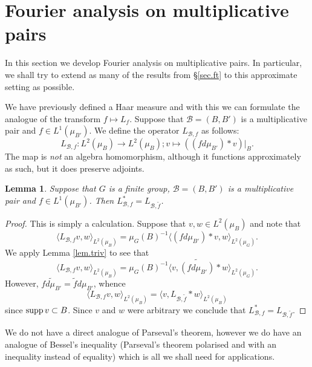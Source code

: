 \documentclass[12pt]{amsart}
\numberwithin{equation}{section}
\theoremstyle{plain}
\newtheorem{lemma}[subsection]{Lemma}
\theoremstyle{definition}
\providecommand{\supp}{\mathop{\rm supp}\nolimits}
\begin{document}
\section{Fourier analysis on multiplicative pairs}\label{sec.locft}

In this section we develop Fourier analysis on multiplicative pairs.  In particular, we shall try to extend as many of the results from \S\ref{sec.ft} to this approximate setting as possible.

We have previously defined a Haar measure and with this we can formulate the analogue of the transform $f \mapsto L_f$.  Suppose that $\mathcal{B}=(B,B')$ is a multiplicative pair and $f \in L^1(\mu_{B'})$.  We define the operator $L_{\mathcal{B},f}$ as follows:
\begin{equation*}
L_{\mathcal{B},f}:L^2(\mu_B) \rightarrow L^2(\mu_B); v \mapsto ((fd\mu_{B'}) \ast v)|_B.
\end{equation*}
The map is \emph{not} an algebra homomorphism, although it functions approximately as such, but it does  preserve adjoints.
\begin{lemma}
Suppose that $G$ is a finite group, $\mathcal{B}=(B,B')$ is a multiplicative pair and $f \in L^1(\mu_{B'})$. Then $L_{\mathcal{B},f}^*=L_{\mathcal{B},\tilde{f}}$.
\end{lemma}
\begin{proof}
This is simply a calculation.  Suppose that $v,w \in L^2(\mu_B)$ and note that
\begin{equation*}
\langle L_{\mathcal{B},f}v,w\rangle_{L^2(\mu_B)} = \mu_G(B)^{-1}\langle (fd\mu_{B'}) \ast v,w \rangle_{L^2(\mu_G)}.
\end{equation*}
We apply Lemma \ref{lem.triv} to see that
\begin{equation*}
\langle L_{\mathcal{B},f}v,w\rangle_{L^2(\mu_B)} = \mu_G(B)^{-1}\langle v,\widetilde{(fd\mu_{B'})} \ast w \rangle_{L^2(\mu_G)}.
\end{equation*}
However, $\widetilde{fd\mu_{B'}} = \tilde{f}d\mu_{B'}$, whence
\begin{equation*}
\langle L_{\mathcal{B},f}v,w\rangle_{L^2(\mu_B)} = \langle v,L_{\mathcal{B},\tilde{f}} \ast w \rangle_{L^2(\mu_B)}
\end{equation*}
since $\supp v \subset B$.  Since $v$ and $w$ were arbitrary we conclude that $L_{\mathcal{B},f}^*=L_{\mathcal{B},\tilde{f}}$.
\end{proof}
We do not have a direct analogue of Parseval's theorem, however we do have an analogue of Bessel's inequality (Parseval's theorem polarised and with an inequality instead of equality) which is all we shall need for applications.
\end{document}
